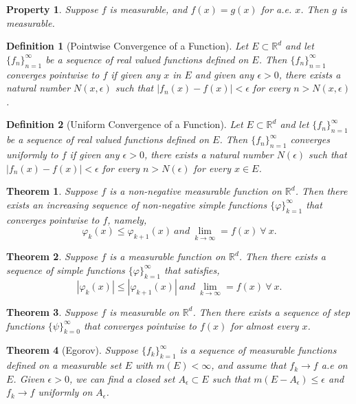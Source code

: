 \documentclass{report}
\theoremstyle{upthm}
\newtheorem{thm}{Theorem}
\newtheorem{defn}{Definition}
\newtheorem{property}{Property}
\newcommand{\reals}{\mathbb{R}}
\newcommand{\set}[1]{\big\lbrace #1 \big\rbrace}
\begin{document}
\begin{property}
	Suppose $f$ is measurable, and $f(x) = g(x)$ for a.e. $x$. Then $g$ is measurable.
\end{property}

\begin{defn}[Pointwise Convergence of a Function]
	Let $E \subset \reals^d$ and let $\set{f_n}_{n=1}^{\infty}$ be a sequence of real valued functions defined on $E$. Then $\set{f_n}_{n=1}^\infty$ converges pointwise to $f$ if given any $x$ in $E$ and	given any $\epsilon > 0$, there exists a natural number $N(x, \epsilon)$ such that $|f_n(x) - f(x)| < \epsilon$ for every $n > N(x, \epsilon)$.
\end{defn}

\begin{defn}[Uniform Convergence of a Function]
	Let $E \subset \reals^d$ and let $\set{f_n}_{n=1}^{\infty}$ be a sequence of real valued functions defined on $E$. Then $\set{f_n}_{n=1}^\infty$ converges uniformly to $f$ if given any $\epsilon > 0$, there exists a natural number $N(\epsilon)$ such that $|f_n(x) - f(x)| < \epsilon$ for every $n > N(\epsilon)$ for every $x \in E$.
\end{defn}

\begin{thm}
	Suppose $f$ is a non-negative measurable function on $\reals^d$. Then there exists an increasing sequence of non-negative simple functions $\set{\varphi}_{k=1}^{\infty} $ that converges pointwise to $f$, namely,
	$$ \varphi_k (x) \leq \varphi_{k+1} (x)\ and\ \lim_{k \rightarrow \infty} = f(x)\ \forall\ x.$$
\end{thm}

\begin{thm}
	Suppose $f$ is a measurable function on $\reals^d$. Then there exists a sequence of simple functions $\set{\varphi}_{k=1}^{\infty} $ that satisfies,
	$$ |\varphi_k (x)| \leq |\varphi_{k+1} (x)| \ and\ \lim_{k \rightarrow \infty} = f(x)\ \forall\ x.$$
\end{thm}

\begin{thm}
	Suppose $f$ is measurable on $\reals^d$. Then there exists a sequence of step functions $\set{\psi}_{k=0}^\infty$ that converges pointwise to $f(x)$ for almost every $x$.
\end{thm}

\begin{thm}[Egorov]
	Suppose $\set{f_k}_{k=1}^\infty$ is a sequence of measurable functions defined on a measurable set $E$ with $m(E) < \infty $, and assume that $f_k \rightarrow f$ a.e on $E$. Given $\epsilon > 0 $, we can find a closed set $A_\epsilon \subset E$ such that $m(E - A_\epsilon) \leq \epsilon$ and $f_k \rightarrow f$ uniformly on $A_\epsilon$.
\end{thm}
\end{document}
